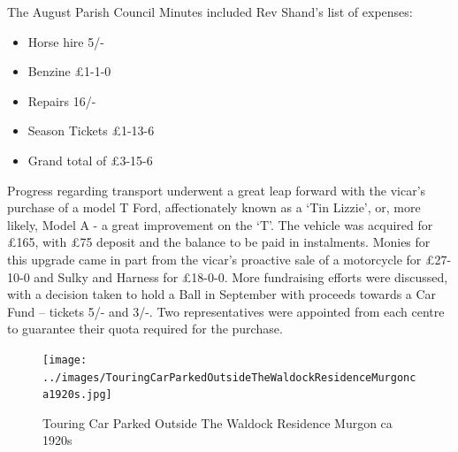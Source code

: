 The August Parish Council Minutes included Rev Shand's list of expenses:



\begin{itemize}

\item

  Horse hire 5/-

\item

  Benzine \pounds1-1-0

\item

  Repairs 16/-

\item

  Season Tickets \pounds1-13-6

\item

  Grand total of \pounds3-15-6

\end{itemize}



\smallskip


Progress regarding transport underwent a great leap forward with the vicar's purchase of a model T Ford, affectionately known as a `Tin Lizzie', or, more likely, Model A - a great improvement on the `T'. The vehicle was acquired for \pounds165, with \pounds75 deposit and the balance to be paid in instalments. Monies for this upgrade came in part from the vicar's proactive sale of a motorcycle for \pounds27-10-0 and Sulky and Harness for \pounds18-0-0. More fundraising efforts were discussed, with a decision taken to hold a Ball in September with proceeds towards a Car Fund -- tickets 5/- and 3/-. Two representatives were appointed from each centre to guarantee their quota required for the purchase.









\begin{figure}[!htb]
\begin{center}
\texttt{[image: ../images/TouringCarParkedOutsideTheWaldockResidenceMurgonca1920s.jpg]}
\caption{Touring Car Parked Outside The Waldock Residence Murgon ca 1920s}
\end{center}
\end{figure}




